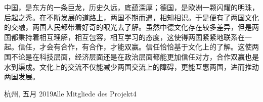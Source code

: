  \par
 中国，是东方的一条巨龙，历史久远，底蕴深厚；德国，是欧洲一颗闪耀的明珠，后起之秀。在不断发展的道路上，两国不期而遇，相知相识。于是便有了两国文化的交融，两国人民都带着好奇的眼光去了解。虽然中德文化存在较多差异，但是两国都秉持着相互理解，相互包容，相互学习的态度，这使得两国紧紧地联系在一起。信任，才会有合作，有合作，才能双赢。信任恰恰基于文化上的了解。这使两国不论是在科技层面，经济层面还是在政治层面都能更加信任对方，合作双赢也是水到渠成。文化上的交流不仅能减少两国交流上的障碍，更能互惠两国，进而推动两国发展。
\vspace{\baselineskip}
\begin{flushright}\noindent
杭州, 五月 2019\hfill {\texttt Alle Mitgliede des Projekt4}\\
\end{flushright}
